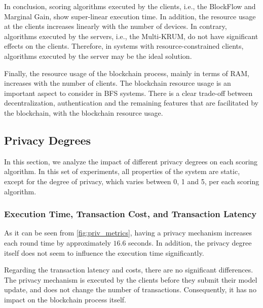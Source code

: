 In conclusion, scoring algorithms executed by the clients, i.e., the BlockFlow and Marginal Gain, show super-linear execution time. In addition, the resource usage at the clients increases linearly with the number of devices. In contrary, algorithms executed by the servers, i.e., the Multi-KRUM, do not have significant effects on the clients. Therefore, in systems with resource-constrained clients, algorithms executed by the server may be the ideal solution.

Finally, the resource usage of the blockchain process, mainly in terms of RAM, increases with the number of clients. The blockchain resource usage is an important aspect to consider in BFS systems. There is a clear trade-off between decentralization, authentication and the remaining features that are facilitated by the blockchain, with the blockchain resource usage.

\subsection{Privacy Degrees}

In this section, we analyze the impact of different privacy degrees on each scoring algorithm. In this set of experiments, all properties of the system are static, except for the degree of privacy, which varies between 0, 1 and 5, per each scoring algorithm.

\subsubsection{Execution Time, Transaction Cost, and Transaction Latency}

As it can be seen from \autoref{fig:priv_metrics}, having a privacy mechanism increases each round time by approximately $16.6$ seconds. In addition, the privacy degree itself does not seem to influence the execution time significantly.


Regarding the transaction latency and costs, there are no significant differences. The privacy mechanism is executed by the clients before they submit their model update, and does not change the number of transactions. Consequently, it has no impact on the blockchain process itself.


